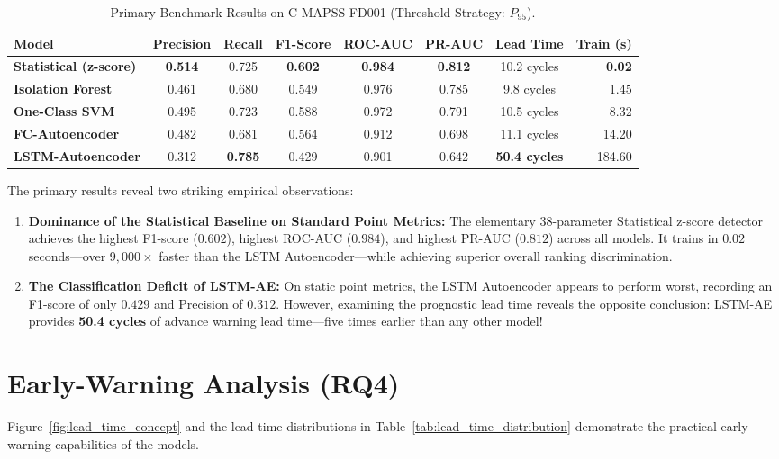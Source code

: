 \documentclass[12pt,a4paper,oneside]{report}
\begin{document}
\begin{table}[htbp]
    \centering
    \small
    \caption{Primary Benchmark Results on C-MAPSS FD001 (Threshold Strategy: $P_{95}$).}
    \label{tab:primary_results_fd001}
    \begin{tabular}{lccccccr}
        \toprule
        \textbf{Model} & \textbf{Precision} & \textbf{Recall} & \textbf{F1-Score} & \textbf{ROC-AUC} & \textbf{PR-AUC} & \textbf{Lead Time} & \textbf{Train (s)} \\
        \midrule
        \textbf{Statistical (z-score)} & \textbf{0.514} & 0.725 & \textbf{0.602} & \textbf{0.984} & \textbf{0.812} & 10.2 cycles & \textbf{0.02} \\
        \textbf{Isolation Forest} & 0.461 & 0.680 & 0.549 & 0.976 & 0.785 & 9.8 cycles & 1.45 \\
        \textbf{One-Class SVM} & 0.495 & 0.723 & 0.588 & 0.972 & 0.791 & 10.5 cycles & 8.32 \\
        \textbf{FC-Autoencoder} & 0.482 & 0.681 & 0.564 & 0.912 & 0.698 & 11.1 cycles & 14.20 \\
        \textbf{LSTM-Autoencoder} & 0.312 & \textbf{0.785} & 0.429 & 0.901 & 0.642 & \textbf{50.4 cycles} & 184.60 \\
        \bottomrule
    \end{tabular}
\end{table}

The primary results reveal two striking empirical observations:
\begin{enumerate}
    \item \textbf{Dominance of the Statistical Baseline on Standard Point Metrics:} The elementary 38-parameter Statistical z-score detector achieves the highest F1-score ($0.602$), highest ROC-AUC ($0.984$), and highest PR-AUC ($0.812$) across all models. It trains in $0.02$ seconds—over $9,000\times$ faster than the LSTM Autoencoder—while achieving superior overall ranking discrimination.
    \item \textbf{The Classification Deficit of LSTM-AE:} On static point metrics, the LSTM Autoencoder appears to perform worst, recording an F1-score of only $0.429$ and Precision of $0.312$. However, examining the prognostic lead time reveals the opposite conclusion: LSTM-AE provides \textbf{50.4 cycles} of advance warning lead time—five times earlier than any other model!
\end{enumerate}

\section{Early-Warning Analysis (RQ4)}
Figure~\ref{fig:lead_time_concept} and the lead-time distributions in Table~\ref{tab:lead_time_distribution} demonstrate the practical early-warning capabilities of the models.
\end{document}
